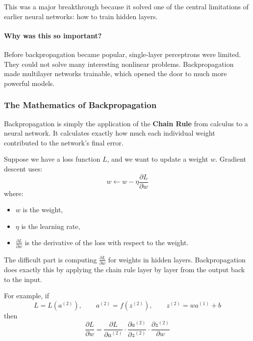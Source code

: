 \documentclass[11pt]{article}
\theoremstyle{smallexample}
\begin{document}
This was a major breakthrough because it solved one of the central limitations of earlier neural networks: how to train hidden layers.

\paragraph{Why was this so important?}
Before backpropagation became popular, single-layer perceptrons were limited. They could not solve many interesting nonlinear problems. Backpropagation made multilayer networks trainable, which opened the door to much more powerful models.


\subsubsection{The Mathematics of Backpropagation}

Backpropagation is simply the application of the \textbf{Chain Rule} from calculus to a neural network. It calculates exactly how much each individual weight contributed to the network's final error.


Suppose we have a loss function \(L\), and we want to update a weight \(w\). Gradient descent uses:
\begin{equation}
w \leftarrow w - \eta \frac{\partial L}{\partial w}
\end{equation}
where:
\begin{itemize}
    \item \(w\) is the weight,
    \item \(\eta\) is the learning rate,
    \item \(\frac{\partial L}{\partial w}\) is the derivative of the loss with respect to the weight.
\end{itemize}

The difficult part is computing \(\frac{\partial L}{\partial w}\) for weights in hidden layers. Backpropagation does exactly this by applying the chain rule layer by layer from the output back to the input.

For example, if
\[
L = L(a^{(2)}), \qquad a^{(2)} = f(z^{(2)}), \qquad z^{(2)} = w a^{(1)} + b
\]
then
\begin{equation}
\frac{\partial L}{\partial w}
=
\frac{\partial L}{\partial a^{(2)}}
\cdot
\frac{\partial a^{(2)}}{\partial z^{(2)}}
\cdot
\frac{\partial z^{(2)}}{\partial w}
\end{equation}
\end{document}
